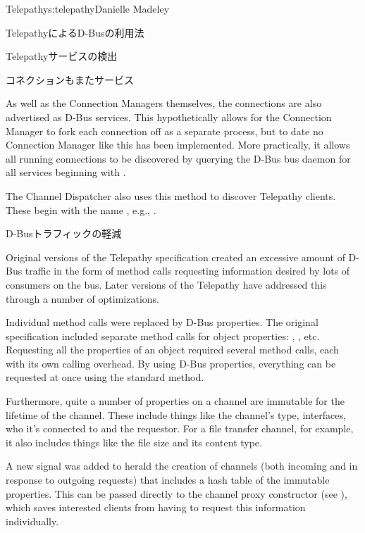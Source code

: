 \begin{aosachapter}{Telepathy}{s:telepathy}{Danielle Madeley}
\begin{aosasect1}{TelepathyによるD-Busの利用法}
\begin{aosasect2}{Telepathyサービスの検出}
\begin{aosabox}{コネクションもまたサービス}

As well as the Connection Managers themselves, the connections are
also advertised as D-Bus services. This hypothetically allows for the
Connection Manager to fork each connection off as a separate process,
but to date no Connection Manager like this has been implemented.
More practically, it allows all running connections to be discovered
by querying the D-Bus bus daemon for all services beginning with
.

\end{aosabox}

The Channel Dispatcher also uses this method to discover Telepathy
clients. These begin with the name , e.g.,
.

\end{aosasect2}

\begin{aosasect2}{D-Busトラフィックの軽減}

Original versions of the Telepathy specification created an excessive
amount of D-Bus traffic in the form of method calls requesting
information desired by lots of consumers on the bus. Later versions of
the Telepathy have addressed this through a number of optimizations.

Individual method calls were replaced by D-Bus properties. The
original specification included separate method calls for object
properties: , ,
etc. Requesting all the properties of an object required several
method calls, each with its own calling overhead. By using D-Bus
properties, everything can be requested at once using the standard
 method.

Furthermore, quite a number of properties on a channel are immutable
for the lifetime of the channel. These include things like the
channel's type, interfaces, who it's connected to and the requestor.
For a file transfer channel, for example, it also includes things like
the file size and its content type.

A new signal was added to herald the creation of channels (both
incoming and in response to outgoing requests) that includes a hash
table of the immutable properties.  This can be passed directly to the
channel proxy constructor (see ),
which saves interested clients from having to request this information
individually.


\end{aosasect2}
\end{aosasect1}
\end{aosachapter}
